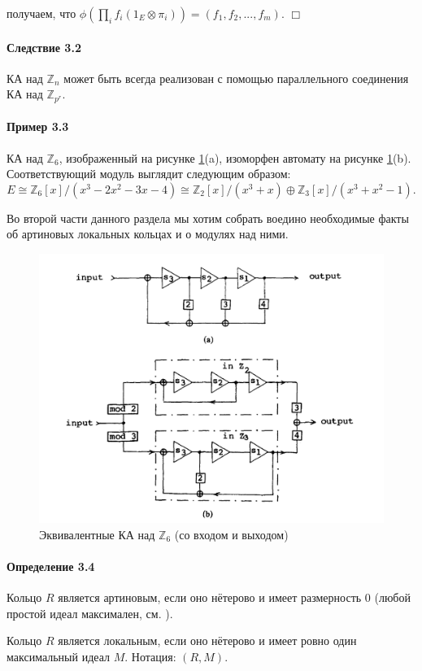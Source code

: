 \documentclass[a4paper,12pt]{article}
\begin{document}
получаем, что $\phi(\prod_i f_i (1_E \otimes \pi_i)) = (f_1, f_2, ..., f_m)$. $\Box$

\paragraph{Следствие 3.2}
КА над $\mathbb{Z}_n$ может быть всегда реализован с помощью параллельного соединения КА над $\mathbb{Z}_{p^r}$.


\paragraph{Пример 3.3}
КА над $\mathbb{Z}_6$, изображенный на рисунке \ref{fig2ab}(a), изоморфен автомату на рисунке \ref{fig2ab}(b). Соответствующий модуль выглядит следующим образом:
$$
E \cong \mathbb{Z}_6 [x] / (x^3 - 2x^2 - 3x - 4) \cong \mathbb{Z}_2 [x] / (x^3 + x) \oplus \mathbb{Z}_3 [x] / (x^3 + x^2 - 1).
$$

Во второй части данного раздела мы хотим собрать воедино необходимые факты об артиновых локальных кольцах и о модулях над ними.

\begin{figure}[h]
	\centering
	\includegraphics[width=0.75\linewidth]{pictures/fig2ab.png}
	\caption{Эквивалентные КА над $\mathbb{Z}_6$ (со входом и выходом)}
	\label{fig2ab}
\end{figure}

\paragraph{Определение 3.4}
Кольцо $R$ является артиновым, если оно нётерово и имеет размерность 0 (любой простой идеал максимален, см. \cite{bib1}).

Кольцо $R$ является локальным, если оно нётерово и имеет ровно один максимальный идеал $M$. Нотация: $(R,M)$.
\end{document}
